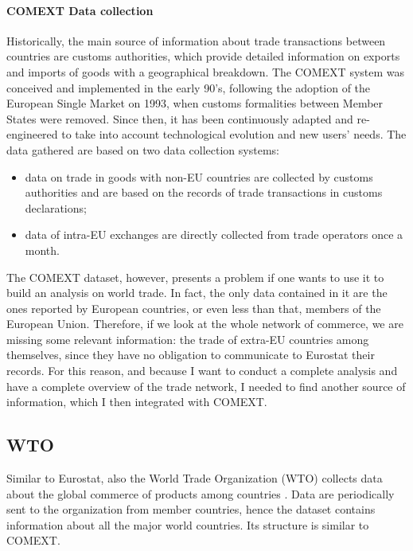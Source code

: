 
\paragraph{COMEXT Data collection}
Historically, the main source of information about trade transactions between countries are customs authorities, which provide detailed information on exports and imports of goods with a geographical breakdown.
The COMEXT system was conceived and implemented in the early 90's,  following the adoption of the European Single Market on 1993, when customs formalities between Member States were removed. Since then, it has been continuously adapted and re-engineered to take into account technological evolution and new users' needs. The data gathered are based on two data collection systems:
\begin{itemize}
    \item data on trade in goods with non-EU countries are collected by customs authorities and are based on the records of trade transactions in customs declarations;
    \item data of intra-EU exchanges are directly collected from trade operators once a month.
\end{itemize}

The COMEXT dataset, however, presents a problem if one wants to use it to build an analysis on world trade. In fact, the only data contained in it are the ones reported by European countries, or even less than that, members of the European Union. Therefore, if we look at the whole network of commerce, we are missing some relevant information: the trade of extra-EU countries among themselves, since they have no obligation to communicate to Eurostat their records.
For this reason, and because I want to conduct a complete analysis and have a complete overview of the trade network, I needed to find another source of information, which I then integrated with COMEXT.

\subsection{WTO}
Similar to Eurostat, also the World Trade Organization (WTO) collects data about the global commerce of products among countries \cite{wto2022stats}. Data are periodically sent to the organization from member countries, hence the dataset contains information about all the major world countries.
Its structure is similar to COMEXT.

